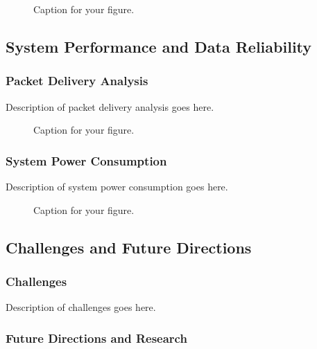 \documentclass[12pt]{article}
\begin{document}
\begin{figure}[htbp]
    \centering
    \caption{Caption for your figure.}
    \label{fig:dashboard-sample}
\end{figure}

\subsection{System Performance and Data Reliability}

\subsubsection{Packet Delivery Analysis}

Description of packet delivery analysis goes here.

\begin{figure}[htbp]
    \centering
    \caption{Caption for your figure.}
    \label{fig:packet-analysis}
\end{figure}

\subsubsection{System Power Consumption}

Description of system power consumption goes here.

\begin{figure}[htbp]
    \centering
    \caption{Caption for your figure.}
    \label{fig:battery-voltage}
\end{figure}

\subsection{Challenges and Future Directions}

\subsubsection{Challenges}

Description of challenges goes here.

\subsubsection{Future Directions and Research}
\end{document}
